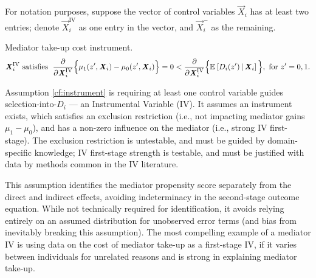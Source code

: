 For notation purposes, suppose the vector of control variables $\vec X_i$ has at least two entries;
denote $\vec X_i^{\text{IV}}$ as one entry in the vector, and $\vec X_i^-$ as the remaining.
\begin{assumptionCF}
    \label{cf:instrument}
    Mediator take-up cost instrument.
    \[ \boldsymbol{\mathit{X}}_i^{\text{IV}} \textnormal{ satisfies } \;
    \frac{\partial}{\partial\boldsymbol{\mathit{X}}_i^{\text{IV}}}\Big\{
        \mu_1(z', \boldsymbol{\mathit{X}}_i) - \mu_0(z', \boldsymbol{\mathit{X}}_i) \Big\} = 0
        < \frac{\partial}{\partial\boldsymbol{\mathit{X}}_i^{\text{IV}}}
        \Big\{
            \mathbb{E}_{} \left[ D_i(z') \, \middle\vert \, \boldsymbol{\mathit{X}}_i \right]\Big\},
        \textnormal{ for } z' = 0, 1. \]
\end{assumptionCF}
\noindent
Assumption \ref{cf:instrument} is requiring at least one control variable guides selection-into-$D_i$ --- an Instrumental Variable (IV).
It assumes an instrument exists, which satisfies an exclusion restriction (i.e., not impacting mediator gains $\mu_1-\mu_0$), and has a non-zero influence on the mediator (i.e., strong IV first-stage).
The exclusion restriction is untestable, and must be guided by domain-specific knowledge; IV first-stage strength is testable, and must be justified with data by methods common in the IV literature.

This assumption identifies the mediator propensity score separately from the direct and indirect effects, avoiding indeterminacy in the second-stage outcome equation.
While not technically required for identification, it avoids relying entirely on an assumed distribution for unobserved error terms (and bias from inevitably breaking this assumption).
The most compelling example of a mediator IV is using data on the cost of mediator take-up as a first-stage IV, if it varies between individuals for unrelated reasons and is strong in explaining mediator take-up.

